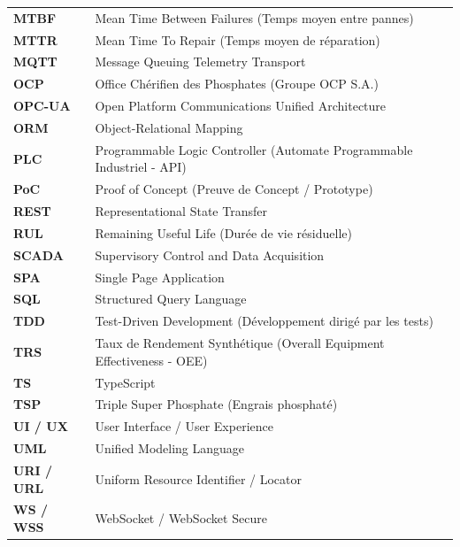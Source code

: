 \begin{table}[htbp]
\begin{tabularx}{\textwidth}{l p{12cm}}
\textbf{MTBF} & Mean Time Between Failures (Temps moyen entre pannes) \\
\textbf{MTTR} & Mean Time To Repair (Temps moyen de réparation) \\
\textbf{MQTT} & Message Queuing Telemetry Transport \\
\textbf{OCP} & Office Chérifien des Phosphates (Groupe OCP S.A.) \\
\textbf{OPC-UA} & Open Platform Communications Unified Architecture \\
\textbf{ORM} & Object-Relational Mapping \\
\textbf{PLC} & Programmable Logic Controller (Automate Programmable Industriel - API) \\
\textbf{PoC} & Proof of Concept (Preuve de Concept / Prototype) \\
\textbf{REST} & Representational State Transfer \\
\textbf{RUL} & Remaining Useful Life (Durée de vie résiduelle) \\
\textbf{SCADA} & Supervisory Control and Data Acquisition \\
\textbf{SPA} & Single Page Application \\
\textbf{SQL} & Structured Query Language \\
\textbf{TDD} & Test-Driven Development (Développement dirigé par les tests) \\
\textbf{TRS} & Taux de Rendement Synthétique (Overall Equipment Effectiveness - OEE) \\
\textbf{TS} & TypeScript \\
\textbf{TSP} & Triple Super Phosphate (Engrais phosphaté) \\
\textbf{UI / UX} & User Interface / User Experience \\
\textbf{UML} & Unified Modeling Language \\
\textbf{URI / URL} & Uniform Resource Identifier / Locator \\
\textbf{WS / WSS} & WebSocket / WebSocket Secure \\
\bottomrule
\end{tabularx}
\end{table}